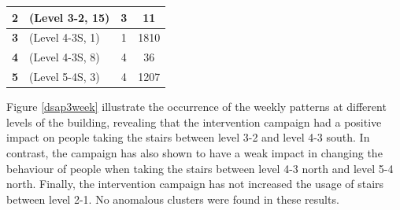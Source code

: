 \begin{table}[t]
\begin{tabular}{clcc}
\textbf{2}             & (Level 3-2, 15)                                                                     & 3                                                                           & 11                                                                                      \\ \hline
\textbf{3}             & (Level 4-3S, 1)                                                                      & 1                                                                           & 1810                                                                                    \\ \hline
\textbf{4}             & (Level 4-3S, 8)                                                                      & 4                                                                           & 36                                                                                      \\ \hline
\textbf{5}             & (Level 5-4S, 3)                                                                      & 4                                                                           & 1207                                                                                    \\ \hline\midrule
\end{tabular}
\end{table}

Figure \ref{dsap3week} illustrate the occurrence of the weekly patterns at different levels of the building, revealing that the intervention campaign had a positive impact on people taking the stairs between level 3-2 and level 4-3 south. In contrast, the campaign has also shown to have a weak impact in changing the behaviour of people when taking the stairs between level 4-3 north and level 5-4 north. Finally, the intervention campaign has not increased the usage of stairs between level 2-1. No anomalous clusters were found in these results. 


